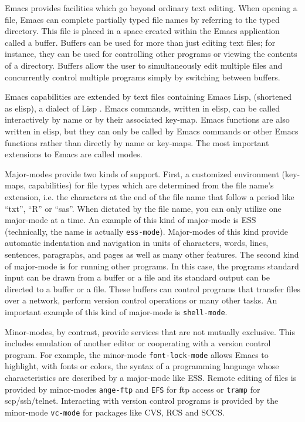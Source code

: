 \documentclass{article}
\newcommand{\stexttt}[1]{{\small\texttt{#1}}}
\begin{document}
Emacs provides facilities which go beyond ordinary text editing.  
When opening a file, Emacs can complete partially typed 
file names by referring to the typed directory.  This file is placed
in a space created within the Emacs application called a buffer.
Buffers can be used for more than just editing text files; for instance,
they can be used for controlling other programs or viewing the contents of
a directory.  Buffers allow the user to simultaneously edit multiple files
and concurrently control multiple programs simply by switching between buffers.

Emacs capabilities are extended by text files containing Emacs Lisp,
(shortened as elisp), a dialect of Lisp
\citep{RChassell1999,PGraham:1996}.  Emacs commands, written in elisp,
can be called interactively by name or by their associated key-map.
Emacs functions are also written in elisp, but they can only be called
by Emacs commands or other Emacs functions rather than directly by
name or key-maps.  The most important extensions to Emacs are called
modes.

Major-modes provide two kinds of support.
First, a customized environment (key-maps, capabilities) for file
types which are determined from the file name's extension, i.e. the characters
at the end of the file name that follow a period like ``txt'', ``R''
or ``sas''.  When dictated by the file name, you can only utilize one 
major-mode at a time.  An example of this kind of major-mode is ESS 
(technically, the name is actually \stexttt{ess-mode}).  Major-modes of this
kind provide automatic indentation and navigation in units of characters,
words, lines, sentences, paragraphs, and pages as well as many other
features.  The second kind of major-mode is for running other programs.  
In this case, the programs standard input can be drawn from a buffer
or a file and its standard output can be directed to a buffer or a file.  
These buffers can control programs that transfer files over a network,
perform version control operations or many other tasks.
An important example of this kind of major-mode is \stexttt{shell-mode}.

Minor-modes, by contrast, provide
services that are not mutually exclusive.  This includes emulation of
another editor or cooperating with a version control program.  For
example, the minor-mode \stexttt{font-lock-mode} allows Emacs to highlight, with
fonts or colors, the syntax of a programming language whose
characteristics are described by a major-mode like ESS. 
Remote editing of files is provided by minor-modes \stexttt{ange-ftp} and 
\stexttt{EFS} for ftp access or \stexttt{tramp} for scp/ssh/telnet.
Interacting with version control programs is provided by the minor-mode
\stexttt{vc-mode} for packages like CVS, RCS and SCCS. 
\end{document}
